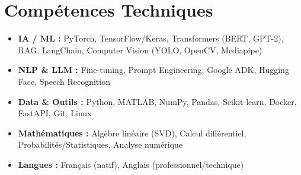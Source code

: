 \documentclass[a4paper,11pt]{article}
\begin{document}
\section{Compétences Techniques}
\begin{itemize}[leftmargin=*, nosep]
    \item \small{\textbf{IA / ML :} PyTorch, TensorFlow/Keras, Transformers (BERT, GPT-2), RAG, LangChain, Computer Vision (YOLO, OpenCV, Mediapipe)}
    \item \small{\textbf{NLP \& LLM :} Fine-tuning, Prompt Engineering, Google ADK, Hugging Face, Speech Recognition}
    \item \small{\textbf{Data \& Outils :} Python, MATLAB, NumPy, Pandas, Scikit-learn, Docker, FastAPI, Git, Linux}
    \item \small{\textbf{Mathématiques :} Algèbre linéaire (SVD), Calcul différentiel, Probabilités/Statistiques, Analyse numérique}
    \item \small{\textbf{Langues :} Français (natif), Anglais (professionnel/technique)}
\end{itemize}

\end{document}
